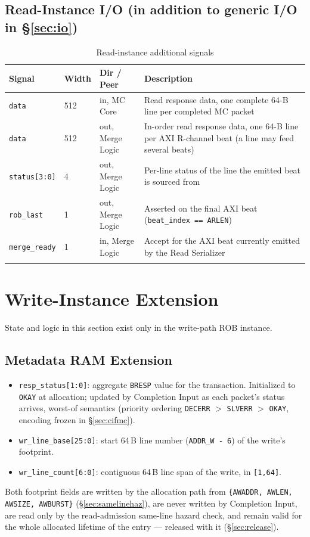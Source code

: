 \subsection*{Read-Instance I/O (in addition to generic I/O in \S\ref{sec:io})}
\begin{longtable}{p{3cm}p{1cm}p{3cm}p{7cm}}
\toprule
\textbf{Signal} & \textbf{Width} & \textbf{Dir / Peer} & \textbf{Description} \\
\midrule
\texttt{data} & 512 & in, MC Core & Read response data, one complete 64-B line per completed MC packet \\
\texttt{data} & 512 & out, Merge Logic & In-order read response data, one 64-B line per AXI R-channel beat (a line may feed several beats) \\
\texttt{status[3:0]} & 4   & out, Merge Logic & Per-line status of the line the emitted beat is sourced from \\
\texttt{rob\_last}   & 1   & out, Merge Logic & Asserted on the final AXI beat (\texttt{beat\_index == ARLEN}) \\
\texttt{merge\_ready} & 1  & in, Merge Logic & Accept for the AXI beat currently emitted by the Read Serializer \\
\bottomrule
\caption{Read-instance additional signals}
\end{longtable}

\section{Write-Instance Extension}
\label{sec:write}

State and logic in this section exist only in the write-path ROB instance.

\subsection{Metadata RAM Extension}
\begin{itemize}[noitemsep]
  \item \texttt{resp\_status[1:0]}: aggregate \texttt{BRESP} value for the transaction. Initialized to \texttt{OKAY} at allocation; updated by Completion Input as each packet's status arrives, worst-of semantics (priority ordering \texttt{DECERR} $>$ \texttt{SLVERR} $>$ \texttt{OKAY}, encoding frozen in \S\ref{sec:cifmc}).
  \item \texttt{wr\_line\_base[25:0]}: start 64\,B line number (\texttt{ADDR\_W - 6}) of the write's footprint.
  \item \texttt{wr\_line\_count[6:0]}: contiguous 64\,B line span of the write, in \texttt{[1,64]}.
\end{itemize}
Both footprint fields are written by the allocation path from \texttt{\{AWADDR, AWLEN, AWSIZE, AWBURST\}} (\S\ref{sec:samelinehaz}), are never written by Completion Input, are read only by the read-admission same-line hazard check, and remain valid for the whole allocated lifetime of the entry --- released with it (\S\ref{sec:release}).

